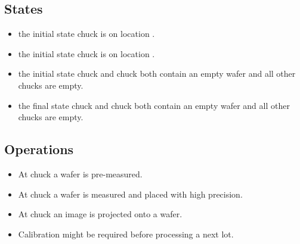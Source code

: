 \subsection{States}
\begin{itemize}
    \item \chuckIn the initial state chuck \chuckA is on location \chuckMeas.
    \item \chuckIn the initial state chuck \chuckB is on location \chuckProj.
    \item \chuckIn the initial state chuck \chuckMeas and chuck \chuckProj both contain an empty wafer and all other chucks are empty.
    \item \chuckIn the final state chuck \chuckMeas and chuck \chuckProj both contain an empty wafer and all other chucks are empty. 
\end{itemize}

\subsection{Operations}
\begin{itemize}
    \item At chuck \chuckIn a wafer is pre-measured.
    \item At chuck \chuckMeas a wafer is measured and placed with high precision.
    \item At chuck \chuckProj an image is projected onto a wafer.
    \item Calibration might be required before processing a next lot.
\end{itemize}
